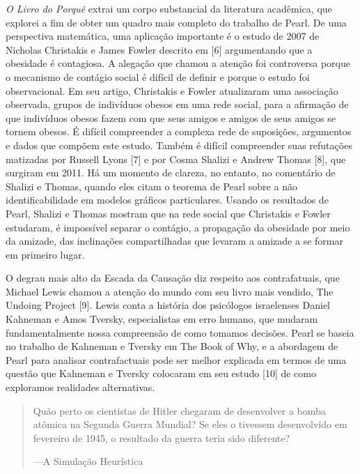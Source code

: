 \noindent
\begin{minipage}[!ht]{\columnwidth}\centering
{}
\label{fig:03}
\end{minipage}

    \textit{O Livro do Porquê} extrai um corpo substancial da literatura acadêmica, que explorei a fim de obter um quadro mais completo do trabalho de Pearl. De uma perspectiva matemática, uma aplicação importante é o estudo de 2007 de Nicholas Christakis e James Fowler descrito em [6] argumentando que a obesidade é contagiosa. A alegação que chamou a atenção foi controversa porque o mecanismo de contágio social é difícil de definir e porque o estudo foi observacional. Em seu artigo, Christakis e Fowler atualizaram uma associação observada, grupos de indivíduos obesos em uma rede social, para a afirmação de que indivíduos obesos fazem com que seus amigos e amigos de seus amigos se tornem obesos. É difícil compreender a complexa rede de suposições, argumentos e dados que compõem este estudo. Também é difícil compreender suas refutações matizadas por Russell Lyons [7] e por Cosma Shalizi e Andrew Thomas [8], que surgiram em 2011. Há um momento de clareza, no entanto, no comentário de Shalizi e Thomas, quando eles citam o teorema de Pearl sobre a não identificabilidade em modelos gráficos particulares. Usando os resultados de Pearl, Shalizi e Thomas mostram que na rede social que Christakis e Fowler estudaram, é impossível separar o contágio, a propagação da obesidade por meio da amizade, das inclinações compartilhadas que levaram a amizade a se formar em primeiro lugar.

    O degrau mais alto da Escada da Causação diz respeito aos contrafatuais, que Michael Lewis chamou a atenção do mundo com seu livro mais vendido, The Undoing Project [9]. Lewis conta a história dos psicólogos israelenses Daniel Kahneman e Amos Tversky, especialistas em erro humano, que mudaram fundamentalmente nossa compreensão de como tomamos decisões. Pearl se baseia no trabalho de Kahneman e Tversky em The Book of Why, e a abordagem de Pearl para analisar contrafactuais pode ser melhor explicada em termos de uma questão que Kahneman e Tversky colocaram em seu estudo [10] de como exploramos realidades alternativas.

\begin{quotation}
    Quão perto os cientistas de Hitler chegaram de desenvolver a bomba atômica na Segunda Guerra Mundial? Se eles o tivessem desenvolvido em fevereiro de 1945, o resultado da guerra teria sido diferente?
    
        —A Simulação Heurística
\end{quotation}

